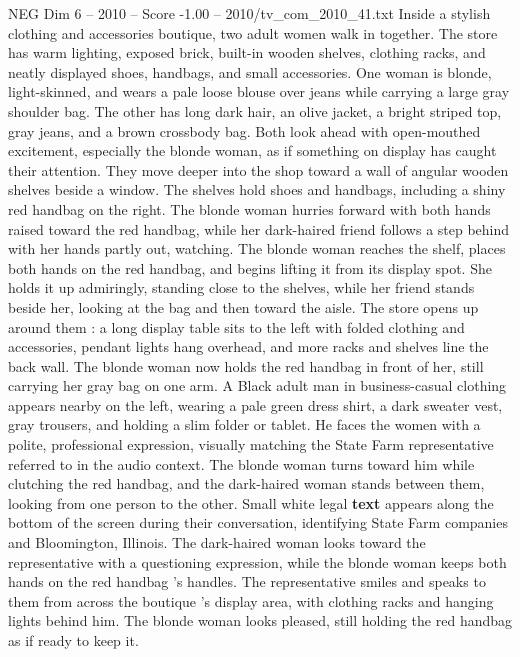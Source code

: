 \begin{textsample}{NEG Dim 6 – 2010 – Score -1.00 – 2010/tv\_com\_2010\_41.txt}  \label{ex:f6_neg_015}
Inside a stylish clothing and accessories boutique, two adult women walk in together.
The store has warm lighting, exposed brick, built-in wooden shelves, clothing racks, and neatly displayed shoes, handbags, and small accessories.
One woman is blonde, light-skinned, and wears a pale loose blouse over jeans while carrying a large gray shoulder bag.
The other has long dark hair, an olive jacket, a bright striped top, gray jeans, and a brown crossbody bag.
Both look ahead with open-mouthed excitement, especially the blonde woman, as if something on display has caught their attention.
They move deeper into the shop toward a wall of angular wooden shelves beside a window.
The shelves hold shoes and handbags, including a shiny red handbag on the right.
The blonde woman hurries forward with both hands raised toward the red handbag, while her dark-haired friend follows a step behind with her hands partly out, watching.
The blonde woman reaches the shelf, places both hands on the red handbag, and begins lifting it from its display spot.
She holds it up admiringly, standing close to the shelves, while her friend stands beside her, looking at the bag and then toward the aisle.
The store opens up around them : a long display table sits to the left with folded clothing and accessories, pendant lights hang overhead, and more racks and shelves line the back wall.
The blonde woman now holds the red handbag in front of her, still carrying her gray bag on one arm.
A Black adult man in business-casual clothing appears nearby on the left, wearing a pale green dress shirt, a dark sweater vest, gray trousers, and holding a slim folder or tablet.
He faces the women with a polite, professional expression, visually matching the State Farm representative referred to in the audio context.
The blonde woman turns toward him while clutching the red handbag, and the dark-haired woman stands between them, looking from one person to the other.
Small white legal \textbf{text} appears along the bottom of the screen during their conversation, identifying State Farm companies and Bloomington, Illinois.
The dark-haired woman looks toward the representative with a questioning expression, while the blonde woman keeps both hands on the red handbag ’s handles.
The representative smiles and speaks to them from across the boutique ’s display area, with clothing racks and hanging lights behind him.
The blonde woman looks pleased, still holding the red handbag as if ready to keep it.

\end{textsample}
